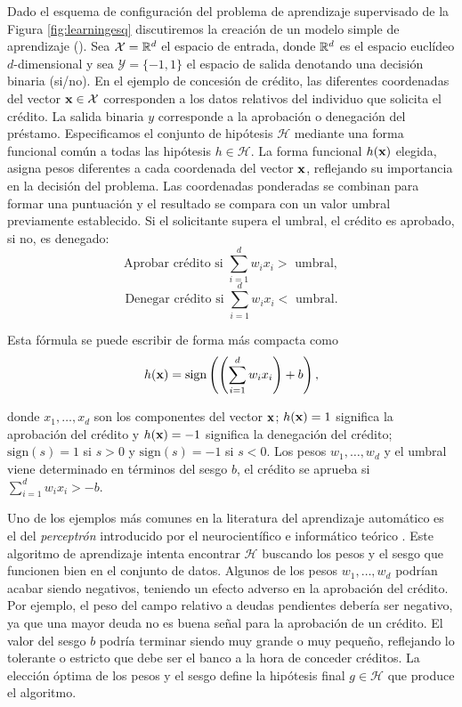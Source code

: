 \documentclass[oneside,openright,titlepage,numbers=noenddot,openany,headinclude,footinclude=true,
cleardoublepage=empty,abstractoff,BCOR=5mm,paper=a4,fontsize=12pt,main=spanish]{scrreprt}
\begin{document}
Dado el esquema de configuración del problema de aprendizaje supervisado de la Figura \ref{fig:learningesq} discutiremos la creación de un modelo simple de aprendizaje (\cite{learning2012}). Sea $\mathcal{X}=\mathbb{R}^d$ el espacio de entrada, donde $\mathbb{R}^d$ es el espacio euclídeo $d$-dimensional y sea $\mathcal{Y}=\{-1,1\}$ el espacio de salida denotando una decisión binaria (si/no). En el ejemplo de concesión de crédito, las diferentes coordenadas del vector $\textbf{x}\in \mathcal{X}$ corresponden a los datos relativos del individuo que solicita el crédito. La salida binaria $y$ corresponde a la aprobación o denegación del préstamo. Especificamos el conjunto de hipótesis $\mathcal{H}$ mediante una forma funcional común a todas las hipótesis $h\in \mathcal{H}$. La forma funcional $h(\textbf{x})$ elegida, asigna pesos diferentes a cada coordenada del vector $\textbf{x}$, reflejando su importancia en la decisión del problema. Las coordenadas ponderadas se combinan para formar una puntuación y el resultado se compara con un valor umbral previamente establecido. Si el solicitante supera el umbral, el crédito es aprobado, si no, es denegado: $$\text{Aprobar crédito si } \sum_{i=1}^d w_ix_i > \text{ umbral},$$ $$\text{Denegar crédito si } \sum_{i=1}^d w_ix_i < \text{ umbral}.$$

Esta fórmula se puede escribir de forma más compacta como 
\begin{equation} \label{eq:sign-6}
h(\textbf{x})=\text{sign}\left(\left( \sum_{i=1}^d w_ix_i\right)+b \right),
\end{equation}


donde $x_1,\dots,x_d$ son los componentes del vector $\textbf{x}$; $h(\textbf{x})=1$ significa la aprobación del crédito y $h(\textbf{x})=-1$ significa la denegación del crédito; $\text{sign}(s)=1$ si $s>0$ y $\text{sign}(s)=-1$ si $s<0$. Los pesos $w_1,\dots,w_d$ y el umbral viene determinado en términos del sesgo $b$, el crédito se aprueba si $\displaystyle \sum_{i=1}^d w_ix_i > -b.$ 

Uno de los ejemplos más comunes en la literatura del aprendizaje automático es el del \textit{perceptrón} introducido por el neurocientífico e informático teórico \cite{perceptron1957}. Este algoritmo de aprendizaje intenta encontrar $\mathcal{H}$ buscando los pesos y el sesgo que funcionen bien en el conjunto de datos. Algunos de los pesos $w_1,\dots,w_d$ podrían acabar siendo negativos, teniendo un efecto adverso en la aprobación del crédito. Por ejemplo, el peso del campo relativo a deudas pendientes debería ser negativo, ya que una mayor deuda no es buena señal para la aprobación de un crédito. El valor del sesgo $b$ podría terminar siendo muy grande o muy pequeño, reflejando lo tolerante o estricto que debe ser el banco a la hora de conceder créditos. La elección óptima de los pesos y el sesgo define la hipótesis final $g \in \mathcal{H}$ que produce el algoritmo.\\
\end{document}
